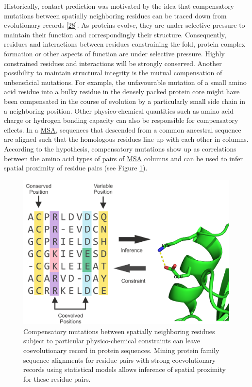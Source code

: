 \documentclass[12pt,a4paper,twoside]{book}
\theoremstyle{definition}
\theoremstyle{definition}
\theoremstyle{remark}
\begin{document}
Historically, contact prediction was motivated by the idea that
compensatory mutations between spatially neighboring residues can be
traced down from evolutionary records
{[}\protect\hyperlink{ref-Gobel1994}{28}{]}. As proteins evolve, they
are under selective pressure to maintain their function and
correspondingly their structure. Consequently, residues and interactions
between residues constraining the fold, protein complex formation or
other aspects of function are under selective pressure. Highly
constrained residues and interactions will be strongly conserved.
Another possibility to maintain structural integrity is the mutual
compensation of unbeneficial mutations. For example, the unfavourable
mutation of a small amino acid residue into a bulky residue in the
densely packed protein core might have been compensated in the course of
evolution by a particularly small side chain in a neighboring position.
Other physico-chemical quantities such as amino acid charge or hydrogen
bonding capacity can also be responsible for compensatory effects. In a
\protect\hyperlink{abbrev}{MSA}, sequences that descended from a common
ancestral sequence are aligned such that the homologous residues line up
with each other in columns. According to the hypothesis, compensatory
mutations show up as correlations between the amino acid types of pairs
of \protect\hyperlink{abbrev}{MSA} columns and can be used to infer
spatial proximity of residue pairs (see Figure
\ref{fig:correlated-mutations}).








\begin{figure}

{\centering \includegraphics[width=0.8\linewidth]{img/intro/correlated-mutations-transparent} 

}

\caption{Compensatory mutations between
spatially neighboring residues subject to particular physico-chemical
constraints can leave coevolutionary record in protein sequences. Mining
protein family sequence alignments for residue pairs with strong
coevolutionary records using statistical models allows inference of
spatial proximity for these residue pairs.}\label{fig:correlated-mutations}
\end{figure}
\end{document}
